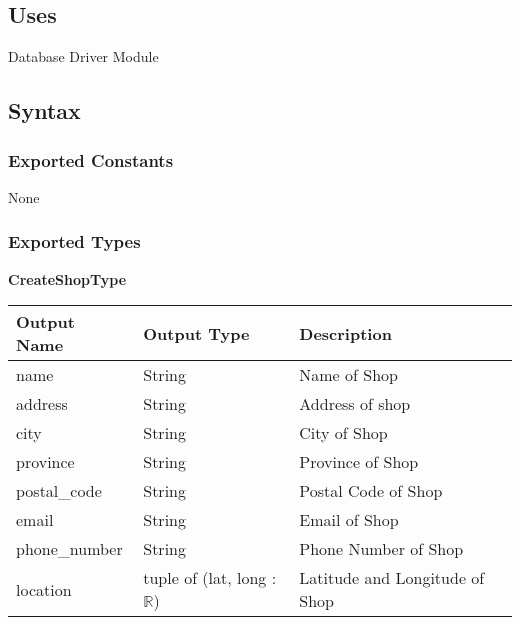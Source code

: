 \documentclass[12pt, titlepage]{article}
\begin{document}
\subsection{Uses}

Database Driver Module

\subsection{Syntax}

\subsubsection{Exported Constants}

None

\subsubsection{Exported Types}

\textbf{CreateShopType}

\begin{table}[H]
	\begin{tabular}{|p{}|p{}|p{}|}
		\hline
		\textbf{Output Name} & \textbf{Output Type}                & \textbf{Description}           \\
		\hline
		name                 & String                              & Name of Shop                   \\
		\hline
		address              & String                              & Address of shop                \\
		\hline
		city                 & String                              & City of Shop                   \\
		\hline
		province             & String                              & Province of Shop               \\
		\hline
		postal\_code         & String                              & Postal Code of Shop            \\
		\hline
		email                & String                              & Email of Shop                  \\
		\hline
		phone\_number        & String                              & Phone Number of Shop           \\
		\hline
		location             & tuple of (lat, long : $\mathbb{R}$) & Latitude and Longitude of Shop \\
		\hline
	\end{tabular}
\end{table}
\end{document}
